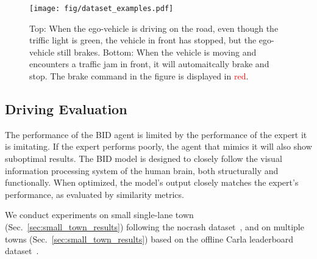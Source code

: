 \begin{figure}[t]
	\centering
	\texttt{[image: fig/dataset\_examples.pdf]}
	\caption{Top: When the ego-vehicle is driving on the road, even though the triffic light is green, the vehicle in front has stopped, but the ego-vehicle still brakes.
		Bottom: When the vehicle is moving and encounters a traffic jam in front, it will automaitcally brake and stop.
		The brake command in the figure is displayed in \textcolor{red}{red}.}
	\label{fig:command_ambiguous}
\end{figure}

\subsection{Driving Evaluation}
\label{sec:Metrics}
\hspace{1pc}The performance of the BID agent is limited by the performance of the expert it is imitating. 
If the expert performs poorly, the agent that mimics it will also show suboptimal results. 
The BID model is designed to closely follow the visual information processing system of the human brain, both structurally and functionally. 
When optimized, the model's output closely matches the expert's performance, as evaluated by similarity metrics.


We conduct experiments on small single-lane town (Sec.~\ref{sec:small_town_results}) following the nocrash dataset~\cite{Zhang:2021,Hu:2022}, and on multiple towns (Sec.~\ref{sec:small_town_results}) based on the offline Carla leaderboard dataset~\cite{Zhang:2021,Hu:2022}. 


